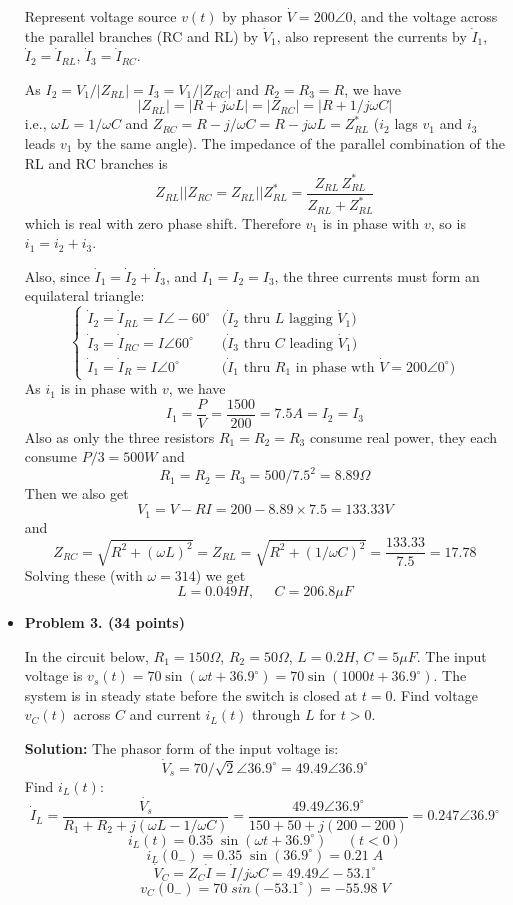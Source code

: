 \begin{itemize}
  Represent voltage source $v(t)$ by phasor $\dot{V}=200\angle 0$, and the voltage 
  across the parallel branches (RC and RL) by $\dot{V}_1$, also represent the currents
  by $\dot{I}_1$, $\dot{I}_2=\dot{I}_{RL}$, $\dot{I}_3=\dot{I}_{RC}$. 

  As $I_2=V_1/|Z_{RL}|=I_3=V_1/|Z_{RC}|$ and $R_2=R_3=R$, we have 
  \[ 
  |Z_{RL}|=|R+j\omega L|=|Z_{RC}|=|R+1/j\omega C|
  \] 
  i.e., $\omega L=1/\omega C$ and $Z_{RC}=R-j/\omega C=R-j\omega L=Z^*_{RL}$ ($i_2$ 
  lags $v_1$ and $i_3$ leads $v_1$ by the same angle). The impedance of the parallel 
  combination of the RL and RC branches is
  \[ 
  Z_{RL}||Z_{RC}=Z_{RL}||Z^*_{RL}=\frac{Z_{RL}\,Z^*_{RL}}{Z_{RL}+Z^*_{RL}}
  \]
  which is real with zero phase shift. Therefore $v_1$ is in phase with $v$, so
  is $i_1=i_2+i_3$.

  Also, since $\dot{I}_1=\dot{I}_2+\dot{I}_3$, and $I_1=I_2=I_3$, the three currents
  must form an equilateral triangle:
  \[ \left\{ \begin{array}{ll}
    \dot{I}_2=\dot{I}_{RL}=I \angle -60^\circ & \mbox{($\dot{I}_2$ thru $L$ lagging $\dot{V}_1$)}\\
    \dot{I}_3=\dot{I}_{RC}=I \angle  60^\circ & \mbox{($\dot{I}_3$ thru $C$ leading $\dot{V}_1$)}\\
    \dot{I}_1=\dot{I}_R=I \angle 0^\circ & \mbox{($\dot{I}_1$ thru $R_1$ in phase wth $\dot{V}=200\angle 0^\circ $)}
  \end{array} \right. \]
  As $i_1$ is in phase with $v$, we have
  \[ I_1=\frac{P}{V}=\frac{1500}{200}=7.5A =I_2=I_3 \]
  Also as only the three resistors $R_1=R_2=R_3$ consume real power, they each consume 
  $P/3=500W$ and 
  \[ R_1=R_2=R_3=500/7.5^2=8.89\Omega \]
  Then we also get
  \[ V_1=V-RI=200-8.89\times 7.5=133.33 V \]
  and
  \[ Z_{RC}=\sqrt{R^2+(\omega L)^2}=Z_{RL}=\sqrt{R^2+(1/\omega C)^2}=\frac{133.33}{7.5}=17.78 \]
  Solving these (with $\omega=314$) we get
  \[ L=0.049H, \;\;\;\;\;C=206.8\mu F \]

\item {\bf Problem 3. (34 points)} 

  In the circuit below, $R_1=150\Omega$, $R_2=50\Omega$, $L=0.2H$, $C=5\mu F$.
  The input voltage is $v_s(t)=70\sin(\omega t+36.9^\circ)=70\sin(1000 t+36.9^\circ)$.
  The system is in steady state before the switch is closed at $t=0$. Find voltage 
  $v_C(t)$ across $C$ and current $i_L(t)$ through $L$ for $t>0$.


  {\bf Solution:} 
  The phasor form of the input voltage is:
  \[ \dot{V}_s=70/\sqrt{2}\angle 36.9^\circ =49.49\angle 36.9^\circ \]
  Find $i_L(t)$:
  \[ \dot{I}_L=\frac{\dot{V_s}}{R_1+R_2+j(\omega L-1/\omega C)}
  =\frac{49.49\angle 36.9^\circ}{150+50+j(200-200)}=0.247\angle 36.9^\circ \]
  \[ i_L(t)=0.35\;\sin(\omega t+36.9^\circ)\;\;\;\;\;(t<0) \]
  \[ i_L(0_-)=0.35\;\sin(36.9^\circ)=0.21\;A \]
  \[ \dot{V}_C=Z_C \dot{I}=\dot{I}/j\omega C =49.49\angle -53.1^\circ \]
  \[ v_C(0_-)=70\;sin(-53.1^\circ)=-55.98\;V \]


\end{itemize}
